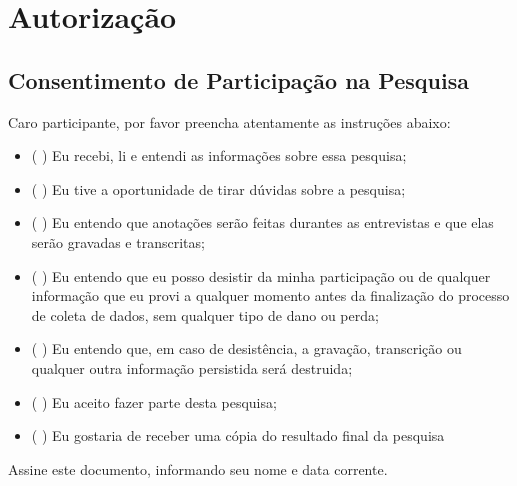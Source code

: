 \chapter{Autorização}
\label{ape:autorizacao}

\section{Consentimento de Participação na Pesquisa}

Caro participante, por favor preencha atentamente as instruções abaixo:

\begin{itemize}
  \item (  ) Eu recebi, li e entendi as informações sobre essa pesquisa;
  \item (  ) Eu tive a oportunidade de tirar dúvidas sobre a pesquisa;
  \item (  ) Eu entendo que anotações serão feitas durantes as entrevistas e que
  elas serão gravadas e transcritas;
  \item (  ) Eu entendo que eu posso desistir da minha participação ou de
  qualquer informação que eu provi a qualquer momento antes da finalização do processo de
  coleta de dados, sem qualquer tipo de dano ou perda;
  \item (  ) Eu entendo que, em caso de desistência, a gravação, transcrição ou
  qualquer outra informação persistida será destruida;
  \item (  ) Eu aceito fazer parte desta pesquisa;
  \item (  ) Eu gostaria de receber uma cópia do resultado final da pesquisa
\end{itemize}

Assine este documento, informando seu nome e data corrente.